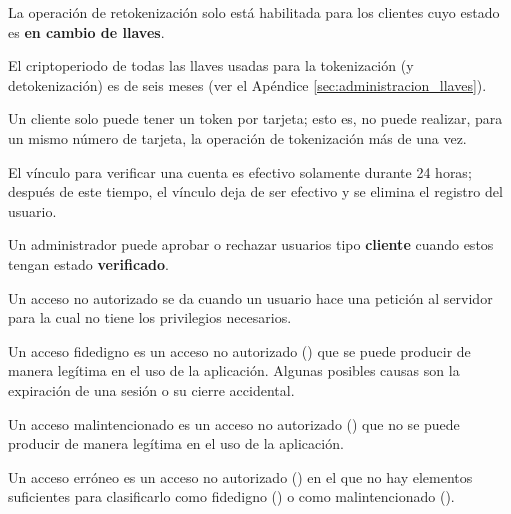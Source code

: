 {
  La operación de retokenización solo está habilitada para los clientes cuyo
  estado es \textbf{en cambio de llaves}.

}

{
  El criptoperiodo de todas las llaves usadas para la tokenización (y
  detokenización) es de seis meses (ver el Apéndice
  \ref{sec:administracion_llaves}).
}

{
  Un cliente solo puede tener un token por tarjeta; esto es, no puede realizar,
  para un mismo número de tarjeta, la operación de tokenización más de una vez.
}



{
  El vínculo para verificar una cuenta es efectivo solamente durante
  24 horas; después de este tiempo, el vínculo deja de ser efectivo y se elimina
  el registro del usuario.
}

{
  Un administrador puede aprobar o rechazar usuarios tipo \textbf{cliente}
  cuando estos tengan estado \textbf{verificado}.
}

{
  Un acceso no autorizado se da cuando un usuario hace una petición al servidor
  para la cual no tiene los privilegios necesarios.
}

{
  Un acceso fidedigno es un acceso no autorizado
  () que se puede producir de manera
  legítima en el uso de la aplicación. Algunas posibles causas son la expiración
  de una sesión o su cierre accidental.
}


{
  Un acceso malintencionado es un acceso no autorizado
  () que no se puede producir de manera
  legítima en el uso de la aplicación.
}

{
  Un acceso erróneo es un acceso no autorizado
  () en el que no hay elementos
  suficientes para clasificarlo como fidedigno
  () o como malintencionado
  ().
}
